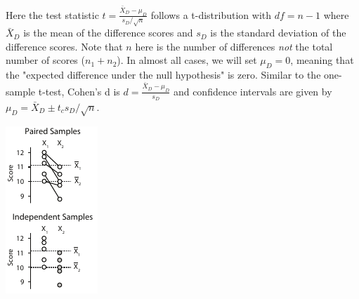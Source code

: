 \documentclass{tufte-handout}
\begin{document}
Here the test statistic $t=\frac{\bar{X}_D-\mu_D}{s_D/\sqrt{n}}$ follows a t-distribution with $df=n-1$  where $\bar{X}_D$  is the mean of the difference scores and $s_D$  is the standard deviation of the difference scores. Note that $n$  here is the number of differences \emph{not} the total number of scores ($n_1+n_2$). In almost all cases, we will set $\mu_D=0$, meaning that the "expected difference under the null hypothesis" is zero. Similar to the one-sample t-test, Cohen's d is $d=\frac{\bar{X}_D-\mu_D}{s_D}$  and confidence intervals are given by  $\mu_D=\bar{X}_D\pm t_c s_D / \sqrt{n}$.


\begin{marginfigure}
  \includegraphics[width=\linewidth]{images/handout3_paired_vs_indep}%

\end{marginfigure}
\end{document}

